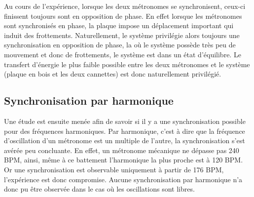 \documentclass[a4paper,11pt]{report}
\begin{document}
Au cours de l'expérience, lorsque les deux métronomes se synchronisent, ceux-ci finissent toujours sont en opposition de phase. En effet lorsque les métronomes sont synchronisés en phase, la plaque impose un  déplacement important qui induit des frottements. Naturellement, le système privilégie alors toujours une synchronisation en opposition de phase, la où le système possède très peu de mouvement et donc de frottements, le système est dans un état d'équilibre. Le transfert d'énergie le plus faible possible entre les deux métronomes et le système (plaque en bois et les deux cannettes) est donc naturellement privilégié.	

\subsection{Synchronisation par harmonique}
Une étude est ensuite menée afin de savoir si il y a une synchronisation possible pour des fréquences harmoniques. Par harmonique, c'est à dire que la fréquence d'oscillation d'un métronome est un multiple de l'autre, la synchronisation s'est avérée peu concluante. En effet, un métronome mécanique ne dépasse pas 240 BPM, ainsi, même à ce battement l'harmonique la plus proche est à 120 BPM. Or une synchronisation est observable uniquement à partir de 176 BPM, l'expérience est donc compromise. Aucune synchronisation par harmonique n'a donc pu être observée dans le cas où les oscillations sont libres.
\end{document}
